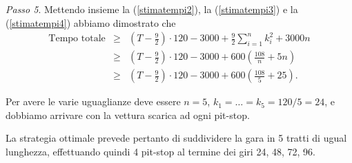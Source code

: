 {\emph{Passo 5}.  Mettendo insieme la (\ref{stimatempi2}), la
(\ref{stimatempi3}) e la (\ref{stimatempi4}) abbiamo dimostrato che
\begin{eqnarray*}
	\mbox{Tempo totale} & \geq & 
	\left(T-\frac{9}{2}\right)\cdot 120-3000+
	\frac{9}{2}\sum_{i=1}^{n}k_{i}^{2}+3000n  \\
	 & \geq & \left(T-\frac{9}{2}\right)\cdot 120-3000+
	 600\left(\frac{108}{n}+5n\right)	 \\
	 & \geq & \left(T-\frac{9}{2}\right)\cdot 120-3000+
	 600\left(\frac{108}{5}+25\right).
\end{eqnarray*}

Per avere le varie uguaglianze deve essere $n=5$, $k_{1}=\ldots=k_{5}=120/5=24$, e dobbiamo arrivare con la vettura scarica ad ogni pit-stop.

La strategia ottimale prevede pertanto di suddividere la gara in 5 tratti di ugual lunghezza, effettuando quindi 4 pit-stop al termine
dei giri 24, 48, 72, 96.}

\renewcommand{\SoluzioniAlternative}{
}

\renewcommand{\Osservazioni}{\TitoloOsservazione Per dimostare la tesi
del Passo 4, potevamo anche ricorrere al calcolo differenziale. Infatti, da uno studio della funzione
$$f(x)=\frac{108}{x}+5x$$
si vede che essa è decrescente nell'intervallo $0<x\leq\sqrt{108/5}$ e crescente per $x\geq \sqrt{108/5}$.
\begin{center}
	\psset{xunit=5ex,yunit=0.2ex}
	\pspicture(0,-20)(8,125)
	
	\psplot[linewidth=1.5\pslinewidth]{1}{8}{108 x div 5 x mul add}
	
	\psaxes[dy=20,Dy=20](0,0)(8,120)
	
	\psset{linecolor=blue, linestyle=dashed}
	\psline(!21.6 sqrt 0)(!21.6 sqrt 108 21.6 sqrt div 5 21.6 sqrt mul add)
	\psline(!0 108 21.6 sqrt div 5 21.6 sqrt mul add)(!21.6 sqrt 108 21.6 sqrt div 5 21.6 sqrt mul add)
	
	\endpspicture
\end{center}

Poiché $4<\sqrt{108/5}<5$, il minimo di tale funzione sugli interi positivi sarà assunto in 4 o 5: non resta quindi che sostituire questi due valori. Vale la pena di sottolineare che è comunque necessario sostituire entrambi i valori, e \emph{non} basta osservare
che $\sqrt{108/5}$ è più vicino a 5 che a 4. }

\renewcommand{\Commenti}{
}